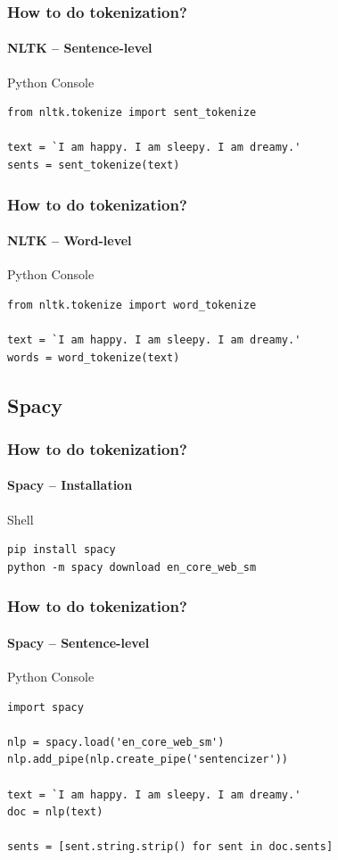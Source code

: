 \documentclass{beamer}
\begin{document}
\begin{frame}[containsverbatim]
    \frametitle{How to do tokenization?}
    \framesubtitle{NLTK -- Sentence-level}
    \begin{block}{Python Console}
        \begin{lstlisting}
from nltk.tokenize import sent_tokenize

text = `I am happy. I am sleepy. I am dreamy.'
sents = sent_tokenize(text)
        \end{lstlisting}    
    \end{block}

\end{frame}

\begin{frame}[containsverbatim]
    \frametitle{How to do tokenization?}
    \framesubtitle{NLTK -- Word-level}
    \begin{block}{Python Console}
        \begin{lstlisting}
from nltk.tokenize import word_tokenize

text = `I am happy. I am sleepy. I am dreamy.' 
words = word_tokenize(text)
        \end{lstlisting}    
    \end{block}

\end{frame}

\subsection{Spacy}
\begin{frame}[containsverbatim]
    \frametitle{How to do tokenization?}
    \framesubtitle{Spacy -- Installation}
    \begin{block}{Shell}
        \begin{lstlisting}
pip install spacy
python -m spacy download en_core_web_sm
        \end{lstlisting}    
    \end{block}

\end{frame}

\begin{frame}[containsverbatim]
    \frametitle{How to do tokenization?}
    \framesubtitle{Spacy -- Sentence-level}
    \begin{block}{Python Console}
        \begin{lstlisting}
import spacy

nlp = spacy.load('en_core_web_sm')
nlp.add_pipe(nlp.create_pipe('sentencizer'))

text = `I am happy. I am sleepy. I am dreamy.' 
doc = nlp(text)

sents = [sent.string.strip() for sent in doc.sents]        
        \end{lstlisting}        
    \end{block}

\end{frame}
\end{document}
